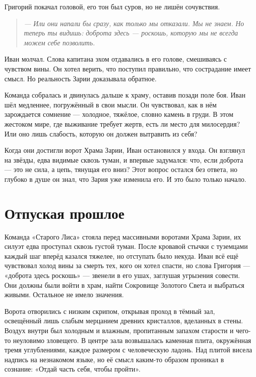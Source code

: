 \documentclass[12pt,a4paper]{book}
\newenvironment{dialogue}{\begin{quote}\itshape}{\end{quote}} %
\begin{document}
Григорий покачал головой, его тон был суров, но не лишён сочувствия.

\begin{dialogue}
--- Или они напали бы сразу, как только мы отказали. Мы не знаем. Но теперь ты видишь: доброта здесь --- роскошь, которую мы не всегда можем себе позволить.
\end{dialogue}

Иван молчал. Слова капитана эхом отдавались в его голове, смешиваясь с чувством вины. Он хотел верить, что поступил правильно, что сострадание имеет смысл. Но реальность Зарии доказывала обратное.

Команда собралась и двинулась дальше к храму, оставив позади поле боя. Иван шёл медленнее, погружённый в свои мысли. Он чувствовал, как в нём зарождается сомнение --- холодное, тяжёлое, словно камень в груди. В этом жестоком мире, где выживание требует жертв, есть ли место для милосердия? Или оно лишь слабость, которую он должен вытравить из себя?

Когда они достигли ворот Храма Зарии, Иван остановился у входа. Он взглянул на звёзды, едва видимые сквозь туман, и впервые задумался: что, если доброта --- это не сила, а цепь, тянущая его вниз? Этот вопрос остался без ответа, но глубоко в душе он знал, что Зария уже изменила его. И это было только начало.

\chapter{Отпуская прошлое}

Команда «Старого Лиса» стояла перед массивными воротами Храма Зарии, их силуэт едва проступал сквозь густой туман. После кровавой стычки с туземцами каждый шаг вперёд казался тяжелее, но отступать было некуда. Иван всё ещё чувствовал холод вины за смерть тех, кого он хотел спасти, но слова Григория --- «доброта здесь роскошь» --- звенели в его ушах, заглушая угрызения совести. Они должны были войти в храм, найти Сокровище Золотого Света и выбраться живыми. Остальное не имело значения.

Ворота отворились с низким скрипом, открывая проход в тёмный зал, освещённый лишь слабым мерцанием древних кристаллов, вделанных в стены. Воздух внутри был холодным и влажным, пропитанным запахом старости и чего-то неуловимо зловещего. В центре зала возвышалась каменная плита, окружённая тремя углублениями, каждое размером с человеческую ладонь. Над плитой висела надпись на незнакомом языке, но её смысл каким-то образом проникал в сознание: «Отдай часть себя, чтобы пройти».
\end{document}
